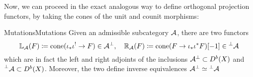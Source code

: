 Now, we can proceed in the exact analogous way to define orthogonal projection functors, by taking the cones of the unit and counit morphisms:

\begin{definition}{Mutations}{Mutations}
    Given an admissible subcategory $\mathcal{A}$, there are two functors
    \begin{equation*}
        \mathbb{L}_{\mathcal{A}}(F) \coloneqq \operatorname{cone}(\iota_*\iota^!\to F)\in \mathcal{A}^\perp, \quad
        \mathbb{R}_{\mathcal{A}}(F) \coloneqq \operatorname{cone}(F\to \iota_*\iota^* F )[-1]\in \prescript{\perp}{}{\mathcal{A}}
    \end{equation*}
    which are in fact the left and right adjoints of the inclusions $\mathcal{A}^\perp \subset D^b(X)$ and $\prescript{\perp}{}{\mathcal{A}}\subset D^b(X)$. Moreover, the two define inverse equivalences $\mathcal{A}^\perp \simeq \prescript{\perp}{}{}\mathcal{A}$
\end{definition}

